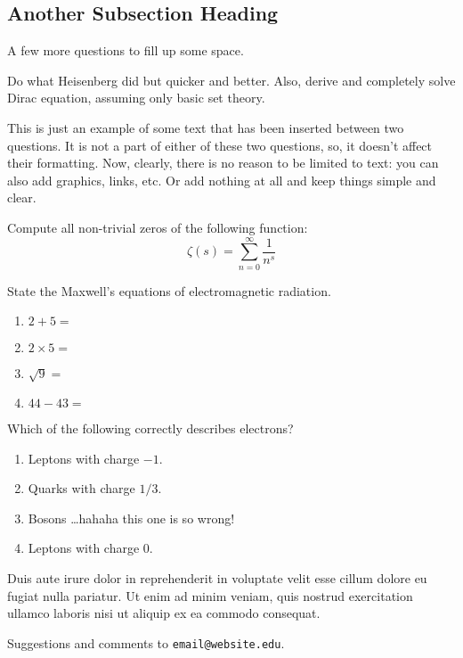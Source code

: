\documentclass[11pt,many]{noether}
\begin{document}
\subsection{Another Subsection Heading}

A few more questions to fill up some space.

\begin{nfquest}
  Do what Heisenberg did but quicker and better. Also, derive and completely solve Dirac equation, assuming only basic set theory. 
\end{nfquest}

This is just an example of some text that has been inserted between two questions. It is not a part of either of these two questions, so, it doesn't affect their formatting. Now, clearly, there is no reason to be limited to text: you can also add graphics, links, etc. Or add nothing at all and keep things simple and clear.

\begin{nfquest}
  Compute all non-trivial zeros of the following function:
  \begin{equation*}
    \zeta(s) = \sum_{n=0}^{\infty} \frac{1}{n^s}
  \end{equation*} 
\end{nfquest}

\begin{nfquest}
  State the Maxwell's equations of electromagnetic radiation.
\end{nfquest}

\begin{nquest}
  \begin{enumerate}
    \item $2 + 5 =$
    \item $2 \times 5 =$
    \item $\sqrt{9} =$
    \item $44 - 43 = $
  \end{enumerate}
\end{nquest}

\begin{nfquest}
  Which of the following correctly describes electrons?
  \begin{enumerate}
    \item Leptons with charge $-1$.
    \item Quarks with charge $1/3$.
    \item Bosons \dots hahaha this one is so wrong!
    \item Leptons with charge $0$.
  \end{enumerate}
\end{nfquest}

Duis aute irure dolor in reprehenderit in voluptate velit esse cillum dolore eu fugiat nulla pariatur. Ut enim ad minim veniam, quis nostrud exercitation ullamco laboris nisi ut aliquip ex ea commodo consequat.

\begin{signature}
Suggestions and comments to \texttt{email@website.edu}.
\end{signature}
\end{document}
